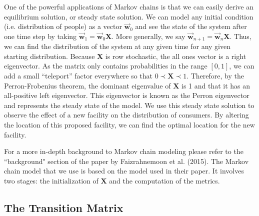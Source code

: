 \documentclass[twoside,twocolumn]{article}
\begin{document}
One of the powerful applications of Markov chains is that we can easily derive an equilibrium solution, or steady state solution. 
We can model any initial condition (i.e. distribution of people) as a vector $\vec{\textbf{w}}_0$ and see the state of the system after one time step by taking $\vec{\textbf{w}}_1 = \vec{\textbf{w}}_0 \textbf{X}$.
More generally, we say $\vec{\textbf{w}}_{n + 1} = \vec{\textbf{w}}_n \textbf{X}$.
Thus, we can find the distribution of the system at any given time for any given starting distribution.
Because $\textbf{X}$ is row stochastic, the all ones vector is a right eigenvector.
As the matrix only contains probabilities in the range $[0, 1]$, we can add a small ``teleport'' factor everywhere so that $0 \prec \textbf{X} \prec 1$.
Therefore, by the Perron-Frobenius theorem, the dominant eigenvalue of $\textbf{X}$ is 1 and that it has an all-positive left eigenvector.
This eigenvector is known as the Perron eigenvector and represents the steady state of the model. %
We use this steady state solution to observe the effect of a new facility on the distribution of consumers.
By altering the location of this proposed facility, we can find the optimal location for the new facility.

For a more in-depth background to Markov chain modeling please refer to the ``background" section of the paper by Faizrahnemoon et al. (2015).
The Markov chain model that we use is based on the model used in their paper.
It involves two stages: the initialization of $\textbf{X}$ and the computation of the metrics.

\subsection{The Transition Matrix}
\label{sec:model_setup}
\end{document}
